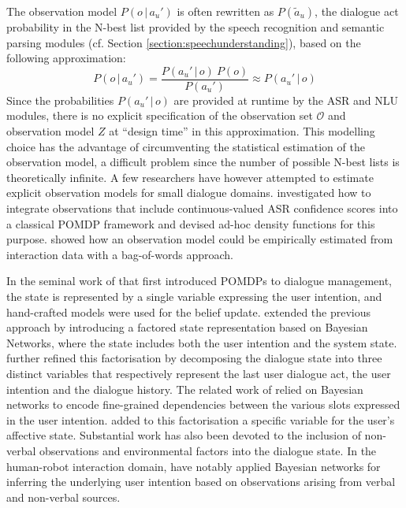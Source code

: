 The observation model $P(o \, | \, a_u')$ is often rewritten as $P(\tilde{a}_u)$, the dialogue act probability in the N-best list provided by the speech recognition and semantic parsing modules (cf. Section \ref{section:speechunderstanding}), based on the following approximation:
\begin{equation}
P(o \, | \, a_u') = \frac{P(a_u' \, | \, o) \ P(o)} {P(a_u')} \approx P(a_u' \, | \, o)
\end{equation}
Since the probabilities $P(a_u' \, | \, o)$ are provided at runtime by the ASR and NLU modules, there is no explicit specification of the observation set $\mathcal{O}$ and observation model $Z$ at ``design time'' in this approximation.  This modelling choice has the advantage of circumventing the statistical estimation of the observation model, a difficult problem since the number of possible N-best lists is theoretically infinite. A few researchers have however attempted to estimate explicit observation models for small dialogue domains. \cite{Williamsetal:2008} investigated how to integrate observations that include continuous-valued ASR confidence scores into a classical POMDP framework and devised ad-hoc density functions for this purpose.  \cite{chinaei2012} showed how an observation model could be empirically estimated from interaction data with a bag-of-words approach. 

In the seminal work of \cite{Roy:2000} that first introduced POMDPs to dialogue management, the state is represented by a single variable expressing the user intention, and hand-crafted models were used for the belief update. \cite{zhang2001} extended the previous approach by introducing a factored state representation based on Bayesian Networks, where the state includes both the user intention and the system state. \cite{williams2005factored,Young:2010} further refined this factorisation by decomposing the dialogue state into three distinct variables that respectively represent the last user dialogue act, the user intention and the dialogue history. The related work of \cite{Thomson:2010:BUD:1772996.1773040} relied on Bayesian networks to encode fine-grained dependencies between the various slots expressed in the user intention. \cite{bui2010} added to this factorisation a specific variable for the user's affective state. Substantial work has also been devoted to the inclusion of non-verbal observations and environmental factors into the dialogue state. In the human-robot interaction domain, \cite{prodanov2003bayesian,Hong:2007} have notably applied Bayesian networks for inferring the underlying user intention based on observations arising from verbal and non-verbal sources. 

